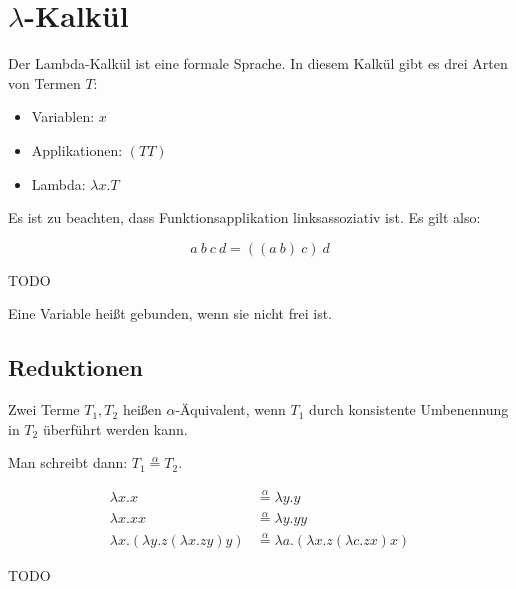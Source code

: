 \chapter{$\lambda$-Kalkül}
Der Lambda-Kalkül ist eine formale Sprache.
In diesem Kalkül gibt es drei Arten von Termen $T$:

\begin{itemize}
	\item Variablen: $x$
	\item Applikationen: $(T T)$
	\item Lambda: $\lambda x. T$
\end{itemize}

Es ist zu beachten, dass Funktionsapplikation linksassoziativ ist. Es gilt also:

\[a~b~c~d = ((a~b)~c)~d\]

\begin{definition}
	TODO
\end{definition}

\begin{definition}
	Eine Variable heißt gebunden, wenn sie nicht frei ist.
\end{definition}

\section{Reduktionen}
\begin{definition}
	Zwei Terme $T_1, T_2$ heißen $\alpha$-Äquivalent, wenn $T_1$ durch 
	konsistente Umbenennung in $T_2$ überführt werden kann.

	Man schreibt dann: $T_1 \overset{\alpha}{=} T_2$.
\end{definition}

\begin{beispiel}
	\begin{align*}
		\lambda x.x    &\overset{\alpha}{=} \lambda y. y\\
		\lambda x. x x &\overset{\alpha}{=} \lambda y. y y\\
		\lambda x. (\lambda y. z (\lambda x. z y) y) &\overset{\alpha}{=}
		\lambda a. (\lambda x. z (\lambda c. z x) x)
	\end{align*}
\end{beispiel}

\begin{definition}
	TODO
\end{definition}


